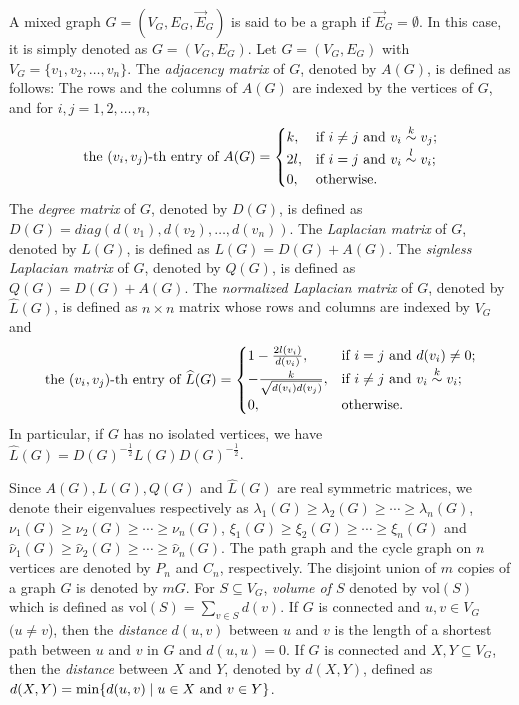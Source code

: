\documentclass[12pt]{article}
\numberwithin{equation}{section}
\begin{document}
A mixed graph $G=(V_G,E_G,\vec{E}_G)$ is said to be a graph if $\vec{E}_G=\emptyset$. In this case, it is simply denoted as $G=(V_G,E_G)$.
Let $G=(V_G,E_G)$ with $V_G=\{v_1,v_2,\ldots,v_n\}$.
The \textit{adjacency matrix} of $G$, denoted by $A(G)$, is defined as follows: The rows and the columns of $A(G)$ are indexed by the vertices of $G$, and for $i,j=1,2,\ldots,n$,
$$ \textnormal{the }(v_i,v_j)\textnormal{-th entry of } A(G) =\begin{cases}
k, & \textnormal{if}~i\neq j\textnormal{ and} ~v_i\overset{k}{\sim} v_j;\\
2l, & \textnormal{if}~i=j\textnormal{ and} ~v_i\overset{l}{\sim} v_i;\\
0, & \textnormal{otherwise}.
\end{cases}$$ 
The \textit{degree matrix} of $G$, denoted by $D(G)$, is defined as $D(G)=diag(d(v_1),d(v_2),\ldots,d(v_n))$. The \textit{Laplacian matrix} of $G$, denoted by $L(G)$, is defined as $L(G)=D(G)+A(G)$. The \textit{signless Laplacian matrix} of $G$, denoted by $Q(G)$, is defined as $Q(G)=D(G)+A(G)$. The \textit{normalized Laplacian matrix} of $G$, denoted by $\widehat{L}(G)$, is defined as $n\times n$ matrix whose rows and columns are indexed by $V_G$ and 
$$ \textnormal{the }(v_i,v_j)\textnormal{-th entry of }\widehat{L}(G) =\begin{cases}
1-\frac{2l(v_i)}{d(v_i)}, & \textnormal{if}~i= j\textnormal{ and } d(v_i)\neq 0;\\
-\frac{k}{\sqrt{d(v_{i})d(v_{j})}}, & \textnormal{if}~i\neq j\textnormal{ and} ~v_i\overset{k}{\sim} v_i;\\
0, & \textnormal{otherwise}.
\end{cases}$$
In particular, if $G$ has no isolated vertices, we have $\widehat{L}(G)=D(G)^{-\frac{1}{2}}L(G)D(G)^{-\frac{1}{2}}$. 

Since $A(G),L(G),Q(G)$ and $\widehat{L}(G)$ are real symmetric matrices, we denote their eigenvalues respectively as $\lambda_1(G)\geq\lambda_2(G)\geq\cdots\geq\lambda_{n}(G)$, $\nu_1(G)\geq\nu_2(G)\geq\cdots\geq\nu_{n}(G)$, $\xi_1(G)\geq\xi_2(G)\geq\cdots\geq\xi_{n}(G)$ and $\hat{\nu}_1(G)\geq\hat{\nu}_2(G)\geq\cdots\geq\hat{\nu}_{n}(G)$. The path graph and the cycle graph on $n$ vertices are denoted by $P_n$ and $C_n$, respectively. The disjoint union of $m$ copies of a graph $G$ is denoted by $mG$. For $S\subseteq V_G$, \textit{volume of $S$} denoted by $\text{vol}(S)$ which is defined as $\text{vol}(S)=\underset{v\in S}{\sum}d(v)$. If $G$ is connected and $u,v\in V_G$ $(u\neq v$), then the \textit{distance} $d(u,v)$ between $u$ and $v$ is the length of a shortest path between $u$ and $v$ in $G$ and $d(u,u)=0$. If $G$ is connected and $X,Y\subseteq V_G$, then the \textit{distance} between $X$ and $Y$, denoted by $d(X,Y)$, defined as $d(X,Y)=\min\{d(u,v)\mid u\in X\textnormal{ and }v\in Y\}$.
\end{document}
